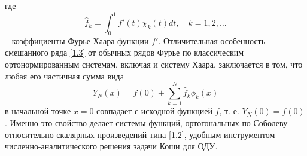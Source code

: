 где
\begin{equation}\label{1.4}
\hat f_k=\int_{0}^1f'(t)\chi_{k}(t)dt, \quad k=1,2,\ldots
\end{equation}
-- коэффициенты Фурье-Хаара функции $f'$. Отличительная особенность смешанного ряда \eqref{1.3} от обычных рядов Фурье по классическим ортонормированным системам, включая и систему Хаара, заключается в том, что любая его частичная сумма вида
\begin{equation}\label{1.5}
Y_N(x)=f(0)+\sum_{k=1}^N \hat f_k \phi_{k}(x)
\end{equation}
в начальной точке $x=0$ совпадает с исходной функцией $f$, т. е. $Y_N(0)=f(0)$. Именно это свойство делает системы функций, ортогональных по Соболеву относительно скалярных произведений типа \eqref{1.2}, удобным инструментом  численно-аналитического решения задачи Коши для ОДУ.

